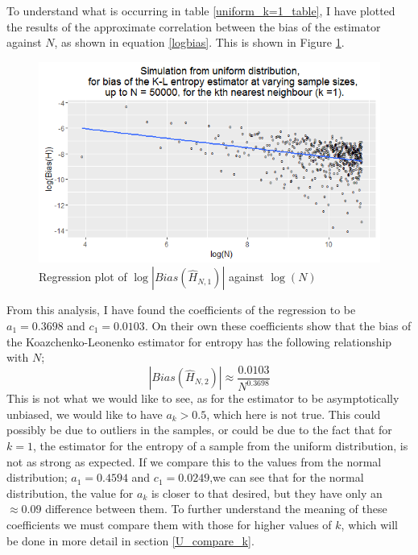 \documentclass{report}
\begin{document}
To understand what is occurring in table \ref{uniform_k=1_table}, I have plotted the results of the approximate correlation between the bias of the estimator against $N$, as shown in equation \ref{logbias}. This is shown in Figure \ref{uniform_k=1_graph}.

\begin{figure}
  \begin{center}
    \includegraphics[width=\textwidth]{./Graphs/Uniform_k=1_plot.png}
  \end{center}
\caption{Regression plot of $\log|Bias(\hat{H}_{N, 1})|$ against $\log(N)$}
  \label{uniform_k=1_graph}
\end{figure}

 From this analysis, I have found the coefficients of the regression to be $a_{1} = 0.3698$ and $c_{1}=0.0103$. On their own these coefficients show that the bias of the Koazchenko-Leonenko estimator for entropy has the following relationship with $N$;
\begin{equation}
|Bias(\hat{H}_{N, 2})| \approx \frac{0.0103}{N^{0.3698}}\nonumber
\end{equation}
This is not what we would like to see, as for the estimator to be asymptotically unbiased, we would like to have $a_{k} > 0.5$, which here is not true. This could possibly be due to outliers in the samples, or could be due to the fact that for $k=1$, the estimator for the entropy of a sample from the uniform distribution, is not as strong as expected. If we compare this to the values from the normal distribution; $a_{1} = 0.4594$ and $c_{1} = 0.0249$,we can see that for the normal distribution, the value for $a_{k}$ is closer to that desired, but they have only an $\approx 0.09$ difference between them. To further understand the meaning of these coefficients we must compare them with those for higher values of $k$, which will be done in more detail in section \ref{U_compare_k}.
\end{document}
